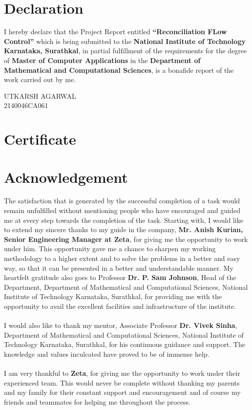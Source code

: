 \documentclass[12pt,a4paper]{report}
\begin{document}
\chapter*{Declaration}
I hereby declare that the Project Report entitled \textbf{“Reconciliation FLow Control”} which is being submitted to the \textbf{National Institute of Technology Karnataka, Surathkal}, in partial fulfillment of the requirements for the degree of \textbf{Master of Computer Applications} in the \textbf{Department of Mathematical and Computational Sciences}, is a bonafide report of the work carried out by me.

\vspace{1cm}

\begin{flushright}
UTKARSH AGARWAL \\
2140046CA061
\end{flushright}


\chapter*{Certificate}

\chapter*{Acknowledgement}

The satisfaction that is generated by the successful completion of a task would remain unfulfilled without mentioning people who have encouraged and guided me at every step towards the completion of the task. Starting with, I would like to extend my sincere thanks to my guide in the company, \textbf{Mr. Anish Kurian, Senior Engineering Manager at Zeta}, for giving me the opportunity to work under him. This opportunity gave me a chance to sharpen my working methodology to a higher extent and to solve the problems in a better and easy way, so that it can be presented in a better and understandable manner. My heartfelt gratitude also goes to Professor \textbf{Dr. P. Sam Johnson}, Head of the Department, Department of Mathematical and Computational Sciences, National Institute of Technology Karnataka, Surathkal, for providing me with the opportunity to avail the excellent facilities and infrastructure of the institute.
\\\\
\noindent I would also like to thank my mentor, Associate Professor \textbf{Dr. Vivek Sinha}, Department of Mathematical and Computational Sciences, National Institute of Technology Karnataka, Surathkal, for his continuous guidance and support. The knowledge and values inculcated have proved to be of immense help.
\\\\
\noindent I am very thankful to \textbf{Zeta}, for giving me the opportunity to work under their experienced team. This would never be complete without thanking my parents and my family for their constant support and encouragement and of course my friends and teammates for helping me throughout the process.
\end{document}
